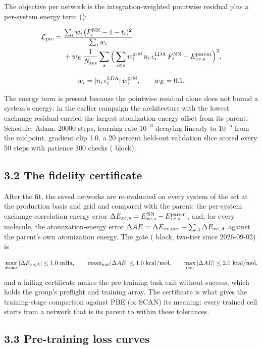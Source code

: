 \documentclass[10pt,a4paper]{article}
\begin{document}
The objective per network is the integration-weighted pointwise residual plus a per-system energy term ():

\[
\begin{aligned}
\mathcal{L}_{\rm pre} = {} & \frac{\sum_i w_i\,(F_i^{\rm NN} - 1 - t_i)^2}{\sum_i w_i} \\
& + w_E\,\frac{1}{N_{\rm sys}}\sum_{s}\Big(\sum_{i\in s} w^{\rm grid}_i\, n_i\,\epsilon_i^{\rm LDA}\, F_i^{\rm NN} - E_{xc,s}^{\rm parent}\Big)^2,
\end{aligned}
\]

\[
w_i = |n_i\, \epsilon_i^{\rm LDA}|\, w_i^{\rm grid}, \qquad w_E = 0.1 .
\]

The energy term is present because the pointwise residual alone does not bound a system's energy: in the earlier campaign the architecture with the lowest exchange residual carried the largest atomization-energy offset from its parent. Schedule: Adam, 20000 steps, learning rate $10^{-3}$ decaying linearly to $10^{-5}$ from the midpoint, gradient clip 1.0, a 20 percent held-out validation slice scored every 50 steps with patience 300 checks ( block).

\subsection*{3.2 The fidelity certificate}

After the fit, the saved networks are re-evaluated on every system of the set at the production basis and grid and compared with the parent: the per-system exchange-correlation energy error $\Delta E_{xc,s} = E_{xc,s}^{\rm NN} - E_{xc,s}^{\rm parent}$, and, for every molecule, the atomization-energy error $\Delta AE = \Delta E_{xc,{\rm mol}} - \sum_A \Delta E_{xc,A}$ against the parent's own atomization energy. The gate ( block, two-tier since 2026-09-02) is

\[
\max_{\rm atoms} |\Delta E_{xc,A}| \le 1.0\ \text{mHa}, \qquad
\mathrm{mean}_{\rm mol} |\Delta AE| \le 1.0\ \text{kcal/mol}, \qquad
\max_{\rm mol} |\Delta AE| \le 2.0\ \text{kcal/mol},
\]

and a failing certificate makes the pre-training task exit without success, which holds the group's preflight and training array. The certificate is what gives the training-stage comparison against PBE (or SCAN) its meaning: every trained cell starts from a network that is its parent to within these tolerances.

\subsection*{3.3 Pre-training loss curves}
\end{document}
